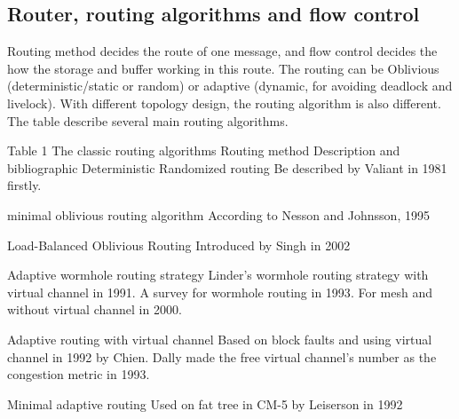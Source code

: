 \subsection{Router, routing algorithms and flow control}
\par Routing method decides the route of one message, and flow control decides the how the storage and buffer working in this route. The routing can be Oblivious (deterministic/static or random) or adaptive (dynamic, for avoiding deadlock and livelock)\cite{dally2004principles}. With different topology design, the routing algorithm is also different. The table describe several main routing algorithms.

\par Table 1 The classic routing algorithms
	Routing method	Description and bibliographic 
Deterministic	Randomized routing	Be described by Valiant in 1981 firstly\cite{valiant1981universal}. 

	minimal oblivious routing algorithm	According to Nesson and Johnsson, 1995\cite{nesson1995romm}

	Load-Balanced Oblivious Routing	Introduced by Singh in 2002\cite{singh2002locality}

Adaptive 	wormhole routing strategy	Linder's wormhole routing strategy with virtual channel in 1991\cite{linder1991adaptive}.
A survey for wormhole routing in 1993\cite{ni1993survey}.
For mesh and without virtual channel in 2000\cite{chiu2000odd}.

	Adaptive routing with virtual channel	Based on block faults and using virtual channel in 1992 by Chien.\cite{chien1992planar}
Dally made the free virtual channel's number as the congestion metric in 1993.\cite{dally1993deadlock}\cite{ramakrishna2016gca}

	Minimal adaptive routing	Used on fat tree in CM-5 by Leiserson in 1992\cite{leiserson1992network}

